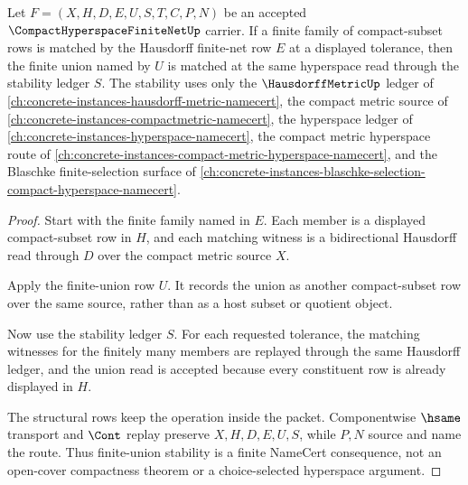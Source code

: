 \begin{theorem}
\label{thm:compact-hyperspace-finite-net-finite-union-stability}
Let $F=(X,H,D,E,U,S,T,C,P,N)$ be an accepted $\CompactHyperspaceFiniteNetUp$ carrier. If a finite family of compact-subset rows is matched by the Hausdorff finite-net row $E$ at a displayed tolerance, then the finite union named by $U$ is matched at the same hyperspace read through the stability ledger $S$. The stability uses only the $\HausdorffMetricUp$ ledger of \autoref{ch:concrete-instances-hausdorff-metric-namecert}, the compact metric source of \autoref{ch:concrete-instances-compactmetric-namecert}, the hyperspace ledger of \autoref{ch:concrete-instances-hyperspace-namecert}, the compact metric hyperspace route of \autoref{ch:concrete-instances-compact-metric-hyperspace-namecert}, and the Blaschke finite-selection surface of \autoref{ch:concrete-instances-blaschke-selection-compact-hyperspace-namecert}.
\end{theorem}
\begin{proof}
Start with the finite family named in $E$. Each member is a displayed compact-subset row in $H$, and each matching witness is a bidirectional Hausdorff read through $D$ over the compact metric source $X$.

Apply the finite-union row $U$. It records the union as another compact-subset row over the same source, rather than as a host subset or quotient object.

Now use the stability ledger $S$. For each requested tolerance, the matching witnesses for the finitely many members are replayed through the same Hausdorff ledger, and the union read is accepted because every constituent row is already displayed in $H$.

The structural rows keep the operation inside the packet. Componentwise $\hsame$ transport and $\Cont$ replay preserve $X,H,D,E,U,S$, while $P,N$ source and name the route. Thus finite-union stability is a finite NameCert consequence, not an open-cover compactness theorem or a choice-selected hyperspace argument.
\end{proof}


